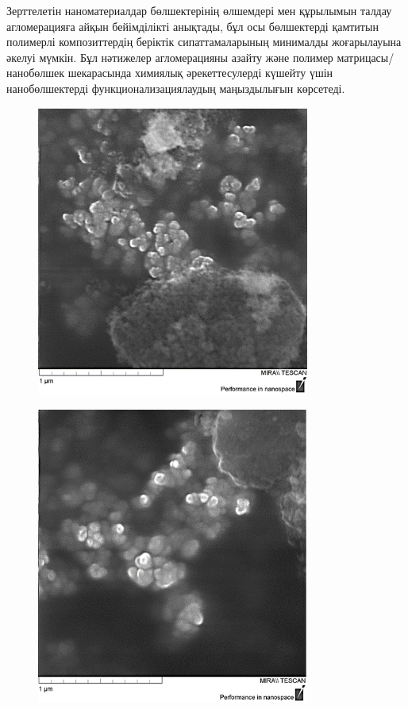Зерттелетін наноматериалдар бөлшектерінің өлшемдері мен құрылымын талдау
агломерацияға айқын бейімділікті анықтады, бұл осы бөлшектерді қамтитын
полимерлі композиттердің беріктік сипаттамаларының минималды
жоғарылауына әкелуі мүмкін. Бұл нәтижелер агломерацияны азайту және
полимер матрицасы/нанобөлшек шекарасында химиялық әрекеттесулерді
күшейту үшін нанобөлшектерді функционализациялаудың маңыздылығын
көрсетеді.

\begin{figure}[H]
	\centering
	\includegraphics[width=0.8\textwidth]{media/chem/image17}
	\caption*{}
\end{figure}

\begin{figure}[H]
	\centering
	\includegraphics[width=0.8\textwidth]{media/chem/image18}
	\caption*{}
\end{figure}


